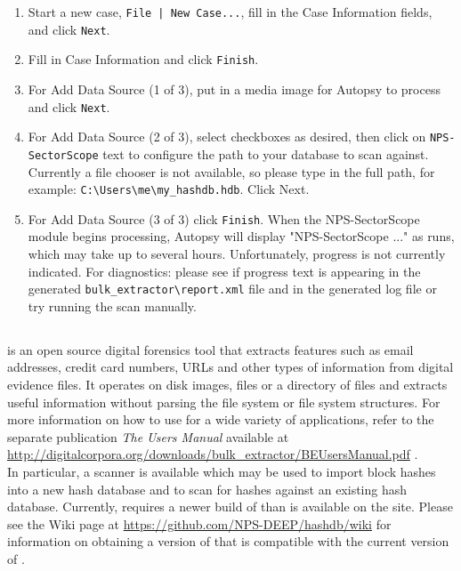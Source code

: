 \documentclass[11pt,fleqn]{article} %
\begin{document}
\begin{enumerate}
\item Start a new case, \verb+File | New Case...+, fill in the Case Information fields, and click \verb+Next+.
\item Fill in Case Information and click \verb+Finish+.
\item For Add Data Source (1 of 3), put in a media image for Autopsy to process and click \verb+Next+.
\item For Add Data Source (2 of 3), select checkboxes as desired, then click on \verb+NPS-SectorScope+ text to configure the path to your \hdb database to scan against. Currently a file chooser is not available, so please type in the full path, for example: \verb+C:\Users\me\my_hashdb.hdb+. Click Next.
\item For Add Data Source (3 of 3) click \verb+Finish+. When the NPS-SectorScope module begins processing, Autopsy will display "NPS-SectorScope ..." as \bulk runs, which may take up to several hours. Unfortunately, \bulk progress is not currently indicated. For diagnostics: please see if progress text is appearing in the generated \verb+bulk_extractor\report.xml+ file and in the generated log file or try running the scan manually.
\end{enumerate}

\subsection{\bulk}
\bulk is an open source digital forensics tool that extracts features such as email addresses, credit card numbers, URLs and other types of information from digital evidence files. It operates on disk images, files or a directory of files and extracts useful information without parsing the file system or file system structures.  For more information on how to use \bulk for a wide variety of applications, refer to the separate publication \textit{The \bulk Users Manual} available at \url{http://digitalcorpora.org/downloads/bulk_extractor/BEUsersManual.pdf} \cite{beusersguide}.\\

In particular, a \hdb \bulk scanner is available which may be used to import block hashes into a new hash database and to scan for hashes against an existing hash database.
Currently, \hdb requires a newer build of \bulk than is available on the \bulk site.
Please see the \hdb Wiki page at \url{https://github.com/NPS-DEEP/hashdb/wiki}
for information on obtaining a version of \bulk that is compatible with the current version of \hdb.\\
\end{document}
